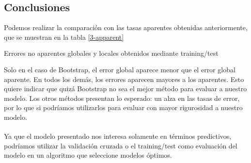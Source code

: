 \documentclass[11pt]{article}
\begin{document}
\subsection{Conclusiones}
Podemos realizar la comparación con las tasas aparentes obtenidas anteriormente, que se muestran en la tabla \ref{3-apparent}
\begin{table}[H]
    \centering
    
    \caption{Errores no aparentes globales y locales obtenidos mediante training/test}
    \label{3-apparent}
\end{table}
Solo en el caso de Bootstrap, el error global aparece menor que el error global aparente. En todos los demás, los errores aparecen mayores a los aparentes. Esto quiere indicar que quizá Bootstrap no sea el mejor método para evaluar a nuestro modelo. Los otros métodos presentan lo esperado: un alza en las tasas de error, por lo que si podríamos utilizarlos para evaluar con mayor rigurosidad a nuestro modelo.
\\
\\Ya que el modelo presentado nos interesa solamente en términos predictivos, podríamos utilizar la validación cruzada o el training/test como evaluación del modelo en un algoritmo que seleccione modelos óptimos.
\pagebreak
%
\printbibliography
\end{document}

